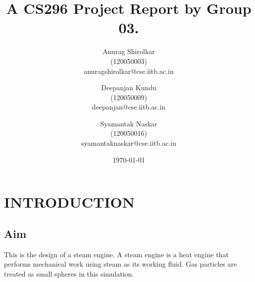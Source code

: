 \documentclass[11pt]{article}
\begin{document}
\title{A CS296 Project Report by Group 03.}
\date{\today}
\author{Anurag Shirolkar \\ (120050003) \\ anuragshirolkar@cse.iitb.ac.in
        \and Deepanjan Kundu \\ (120050009) \\ deepanjan@cse.iitb.ac.in
        \and Syamantak Naskar \\ (120050016) \\ syamantaknaskar@cse.iitb.ac.in}
\maketitle
\section{INTRODUCTION}
\subsection{Aim}
This is the design of a steam engine. A steam engine is a heat engine that performs mechanical work using steam as its working fluid. Gas particles are treated as small spheres in this simulation.
\end{document}
